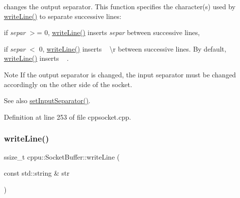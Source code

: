 changes the output separator. This function specifies the character(s) used by \mbox{\hyperlink{classcppu_1_1_socket_buffer_a92ae0351aaee8719d34e8c4618495d59}{write\+Line()}} to separate successive lines\+: 


\begin{DoxyItemize}
\item if {\itshape separ} $>$= 0, \mbox{\hyperlink{classcppu_1_1_socket_buffer_a92ae0351aaee8719d34e8c4618495d59}{write\+Line()}} inserts {\itshape separ} between successive lines,
\item if {\itshape separ} $<$ 0, \mbox{\hyperlink{classcppu_1_1_socket_buffer_a92ae0351aaee8719d34e8c4618495d59}{write\+Line()}} inserts ~\newline
\textbackslash{}r between successive lines. By default, \mbox{\hyperlink{classcppu_1_1_socket_buffer_a92ae0351aaee8719d34e8c4618495d59}{write\+Line()}} inserts ~\newline
. \begin{DoxyNote}{Note}
If the output separator is changed, the input separator must be changed accordingly on the other side of the socket. 
\end{DoxyNote}
\begin{DoxySeeAlso}{See also}
\mbox{\hyperlink{classcppu_1_1_socket_buffer_acadf4540c1e3eba67b014753b84b482c}{set\+Input\+Separator()}}. 
\end{DoxySeeAlso}

\end{DoxyItemize}

Definition at line 253 of file cppsocket.\+cpp.


\begin{DoxyCode}{0}

\end{DoxyCode}
\mbox{\label{classcppu_1_1_socket_buffer_a92ae0351aaee8719d34e8c4618495d59}} 
\subsubsection{\texorpdfstring{writeLine()}{writeLine()}}
{\footnotesize\ttfamily ssize\+\_\+t cppu\+::\+Socket\+Buffer\+::write\+Line (\begin{DoxyParamCaption}\item[{const std\+::string \&}]{str }\end{DoxyParamCaption})\hspace{0.3cm}{\ttfamily [virtual]}}



